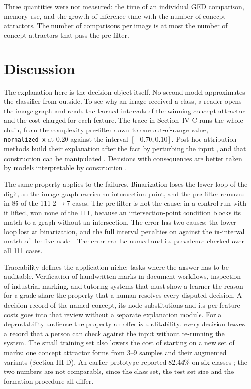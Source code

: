Three quantities were not measured: the time of an individual GED comparison,
memory use, and the growth of inference time with the number of concept
attractors. The number of comparisons per image is at most the number of
concept attractors that pass the pre-filter.

\section{Discussion}

The explanation here is the decision object itself. No second model
approximates the classifier from outside. To see why an image received a class,
a reader opens the image graph and reads the learned intervals of the winning
concept attractor and the cost charged for each feature. The trace in
Section~IV-C runs the whole chain, from the complexity pre-filter down to one
out-of-range value, \texttt{normalized\_x} at 0.20 against the interval
$[-0.70, 0.10]$. Post-hoc attribution methods build
their explanation after the fact by perturbing the input
\cite{ribeiro2016,lundberg2017}, and that construction can be manipulated
\cite{slack2020}. Decisions with consequences are better taken by models
interpretable by construction \cite{rudin2019}.

The same property applies to the failures. Binarization loses the lower loop of
the digit, so the image graph carries no intersection point, and the pre-filter
removes  in 86 of the 111 2$\rightarrow$7 cases. The pre-filter is
not the cause: in a control run with it lifted,  won none of the 111,
because an intersection-point condition blocks its match to a graph without an
intersection. The error has two causes: the lower loop lost at binarization,
and the full interval penalties on  against the in-interval match of
the five-node . The error can be named and its prevalence checked
over all 111 cases.

Traceability defines the application niche: tasks where the answer has to be
auditable. Verification of handwritten marks in document workflows, inspection
of industrial marking, and tutoring systems that must show a learner the reason
for a grade share the property that a human resolves every disputed decision. A
decision record of the named concept, its node substitutions and its
per-feature costs goes into that review without a separate explanation module.
For a dependability audience the property on offer is auditability: every
decision leaves a record that a person can check against the input without
re-running the system.
The small training set also lowers the cost of starting on a new set of marks:
one concept attractor forms from 3--9 samples and their augmented variants
(Section III-D). An earlier
prototype reported 82.44\% on six classes \cite{parzhyn2025energy}; the two
numbers are not comparable, since the class set, the test set size and the
formation procedure all differ.

